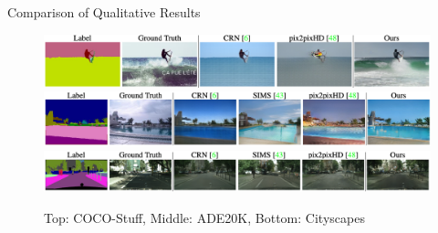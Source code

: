 \documentclass{beamer}
\begin{document}
\begin{frame}{Comparison of Qualitative Results}
    \begin{figure}
        \centering
        \includegraphics[width=0.93\linewidth]{figures/results_coco.png}
        \vspace{0.3cm}
        \includegraphics[width=0.93\linewidth]{figures/results_ade-20k.png}
        \vspace{0.3cm}
        \includegraphics[width=0.93\linewidth]{figures/results_cityscapes.png} 
        \caption{Top: COCO-Stuff, Middle: ADE20K, Bottom: Cityscapes}
    \end{figure}
\end{frame}
\end{document}

